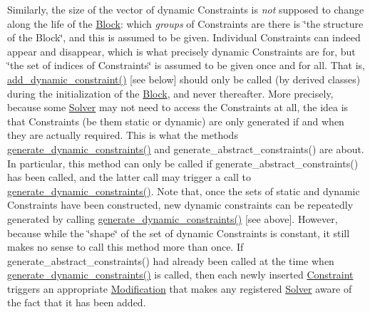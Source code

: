 Similarly, the size of the vector of dynamic Constraints is {\itshape not} supposed to change along the life of the \mbox{\hyperlink{class_s_m_spp__di__unipi__it_1_1_block}{Block}}\+: which {\itshape groups} of Constraints are there is \char`\"{}the structure of the Block\char`\"{}, and this is assumed to be given. Individual Constraints can indeed appear and disappear, which is what precisely dynamic Constraints are for, but \char`\"{}the set of indices of
   Constraints\char`\"{} is assumed to be given once and for all. That is, \mbox{\hyperlink{class_s_m_spp__di__unipi__it_1_1_block_af8871ad704bc4e8f3109a26103bfb3ff}{add\+\_\+dynamic\+\_\+constraint()}} \mbox{[}see below\mbox{]} should only be called (by derived classes) during the initialization of the \mbox{\hyperlink{class_s_m_spp__di__unipi__it_1_1_block}{Block}}, and never thereafter. More precisely, because some \mbox{\hyperlink{class_s_m_spp__di__unipi__it_1_1_solver}{Solver}} may not need to access the Constraints at all, the idea is that Constraints (be them static or dynamic) are only generated if and when they are actually required. This is what the methods \mbox{\hyperlink{class_s_m_spp__di__unipi__it_1_1_block_a306892932ce912f30548f3f3e4072e9b}{generate\+\_\+dynamic\+\_\+constraints()}} and generate\+\_\+abstract\+\_\+constraints() are about. In particular, this method can only be called if generate\+\_\+abstract\+\_\+constraints() has been called, and the latter call may trigger a call to \mbox{\hyperlink{class_s_m_spp__di__unipi__it_1_1_block_a306892932ce912f30548f3f3e4072e9b}{generate\+\_\+dynamic\+\_\+constraints()}}. Note that, once the sets of static and dynamic Constraints have been constructed, new dynamic constraints can be repeatedly generated by calling \mbox{\hyperlink{class_s_m_spp__di__unipi__it_1_1_block_a306892932ce912f30548f3f3e4072e9b}{generate\+\_\+dynamic\+\_\+constraints()}} \mbox{[}see above\mbox{]}. However, because while the \char`\"{}shape\char`\"{} of the set of dynamic Constraints is constant, it still makes no sense to call this method more than once. If generate\+\_\+abstract\+\_\+constraints() had already been called at the time when \mbox{\hyperlink{class_s_m_spp__di__unipi__it_1_1_block_a306892932ce912f30548f3f3e4072e9b}{generate\+\_\+dynamic\+\_\+constraints()}} is called, then each newly inserted \mbox{\hyperlink{class_s_m_spp__di__unipi__it_1_1_constraint}{Constraint}} triggers an appropriate \mbox{\hyperlink{class_s_m_spp__di__unipi__it_1_1_modification}{Modification}} that makes any registered \mbox{\hyperlink{class_s_m_spp__di__unipi__it_1_1_solver}{Solver}} aware of the fact that it has been added. \mbox{\label{class_s_m_spp__di__unipi__it_1_1_block_a9c17adfb0c344b44e163d40f7fc6926f}} 
